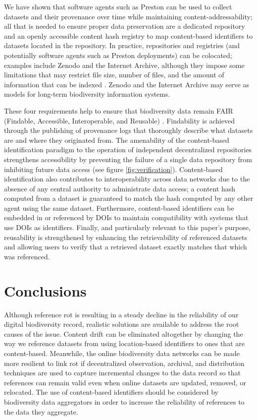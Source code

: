 We have shown that software agents such as Preston can be used to collect datasets and their provenance over time while maintaining content-addressability; all that is needed to ensure proper data preservation are a dedicated repository and an openly accessible content hash registry to map content-based identifiers to datasets located in the repository. In practice, repositories and registries (and potentially software agents such as Preston deployments) can be colocated; examples include Zenodo and the Internet Archive, although they impose some limitations that may restrict file size, number of files, and the amount of information that can be indexed \citep{zenodo_2019,archive_2019}. Zenodo and the Internet Archive may serve as models for long-term biodiversity information systems. 

These four requirements help to ensure that biodiversity data remain FAIR (Findable, Accessible, Interoperable, and Reusable) \citep{Wilkinson_2016}. Findability is achieved through the publishing of provenance logs that thoroughly describe what datasets are and where they originated from. The amenability of the content-based identification paradigm to the operation of independent decentralized repositories strengthens accessibility by preventing the failure of a single data repository from inhibiting future data access (see figure \ref{fig:verification}). Content-based identification also contributes to interoperability across data networks due to the absence of any central authority to administrate data access; a content hash computed from a dataset is guaranteed to match the hash computed by any other agent using the same dataset. Furthermore, content-based identifiers can be embedded in or referenced by DOIs to maintain compatibility with systems that use DOIs as identifiers. Finally, and particularly relevant to this paper's purpose, reusability is strengthened by enhancing the retrievability of referenced datasets and allowing users to verify that a retrieved dataset exactly matches that which was referenced.



\section*{Conclusions}
Although reference rot is resulting in a steady decline in the reliability of our digital biodiversity record, realistic solutions are available to address the root causes of the issue. Content drift can be eliminated altogether by changing the way we reference datasets from using location-based identifiers to ones that are content-based. Meanwhile, the online biodiversity data networks can be made more resilient to link rot if decentralized observation, archival, and distribution techniques are used to capture incremental changes to the data record so that references can remain valid even when online datasets are updated, removed, or relocated. The use of content-based identifiers should be considered by biodiversity data aggregators in order to increase the reliability of references to the data they aggregate.

